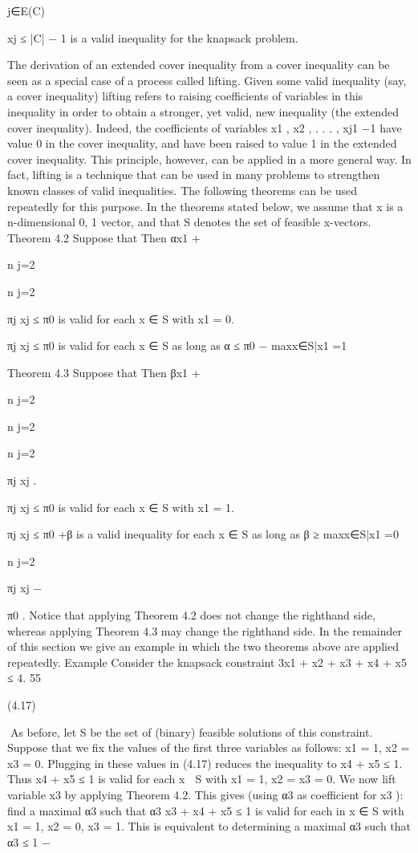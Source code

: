 j∈E(C)

xj ≤ |C| − 1 is a valid inequality for the knapsack problem.

The derivation of an extended cover inequality from a cover inequality can be seen as a special case
of a process called lifting. Given some valid inequality (say, a cover inequality) lifting refers to raising
coefficients of variables in this inequality in order to obtain a stronger, yet valid, new inequality (the
extended cover inequality). Indeed, the coefficients of variables x1 , x2 , . . . , xj1 −1 have value 0 in the cover
inequality, and have been raised to value 1 in the extended cover inequality. This principle, however, can
be applied in a more general way. In fact, lifting is a technique that can be used in many problems to
strengthen known classes of valid inequalities. The following theorems can be used repeatedly for this
purpose. In the theorems stated below, we assume that x is a n-dimensional {0, 1} vector, and that S
denotes the set of feasible x-vectors.
Theorem 4.2 Suppose that
Then αx1 +

n
j=2

n
j=2

πj xj ≤ π0 is valid for each x ∈ S with x1 = 0.

πj xj ≤ π0 is valid for each x ∈ S as long as α ≤ π0 − maxx∈S|x1 =1

Theorem 4.3 Suppose that
Then βx1 +

n
j=2

n
j=2

n
j=2

πj xj .

πj xj ≤ π0 is valid for each x ∈ S with x1 = 1.

πj xj ≤ π0 +β is a valid inequality for each x ∈ S as long as β ≥ maxx∈S|x1 =0

n
j=2

πj xj −

π0 .
Notice that applying Theorem 4.2 does not change the righthand side, whereas applying Theorem 4.3
may change the righthand side. In the remainder of this section we give an example in which the two
theorems above are applied repeatedly.
Example Consider the knapsack constraint
3x1 + x2 + x3 + x4 + x5 ≤ 4.
55

(4.17)

As before, let S be the set of (binary) feasible solutions of this constraint. Suppose that we fix the values
of the first three variables as follows:
x1 = 1, x2 = x3 = 0.
Plugging in these values in (4.17) reduces the inequality to x4 + x5 ≤ 1. Thus x4 + x5 ≤ 1 is valid for
each x ∈ S with x1 = 1, x2 = x3 = 0.
We now lift variable x3 by applying Theorem 4.2. This gives (using α3 as coefficient for x3 ): find a
maximal α3 such that α3 x3 + x4 + x5 ≤ 1 is valid for each in x ∈ S with x1 = 1, x2 = 0, x3 = 1. This is
equivalent to determining a maximal α3 such that
α3 ≤ 1 −

